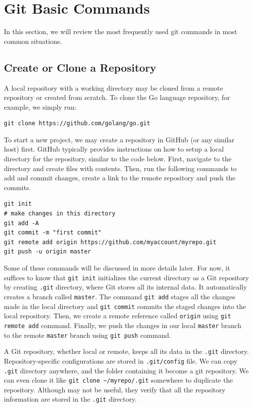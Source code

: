 \documentclass[11pt]{article}
\begin{document}
\section{\label{orgtarget4} Git Basic Commands}
\label{sec:orgheadline20}
In this section, we will review the most frequently used git commands in most common situations.
\subsection{Create or Clone a Repository}
\label{sec:orgheadline8}
A local repository with a working directory may be cloned from a remote repository or created from scratch. To clone the Go language repository, for example, we simply run:
\begin{verbatim}
git clone https://github.com/golang/go.git
\end{verbatim}
To start a new project, we may create a repository in GitHub (or any similar host) first. GitHub typically provides instructions on how to setup a local directory for the repository, similar to the code below. First, navigate to the directory and create files with contents. Then, run the following commands to add and commit changes, create a link to the remote repository and push the commits.
\begin{verbatim}
git init
# make changes in this directory
git add -A
git commit -m "first commit"
git remote add origin https://github.com/myaccount/myrepo.git
git push -u origin master
\end{verbatim}
Some of these commands will be discussed in more details later. For now, it suffices to know that \texttt{git init} initializes the current directory as a Git repository by creating \texttt{.git} directory, where Git stores all its internal data. It automatically creates a branch called \texttt{master}. The command \texttt{git add} stages all the changes made in the local directory and \texttt{git commit} commits the staged changes into the local repository. Then, we create a remote reference called \texttt{origin} using \texttt{git remote add} command. Finally, we push the changes in our local \texttt{master} branch to the remote \texttt{master} branch using \texttt{git push} command.

A Git repository, whether local or remote, keeps all its data in the \texttt{.git} directory. Repository-specific configurations are stored in \texttt{.git/config} file. We can copy \texttt{.git} directory anywhere, and the folder containing it become a git repository. We can even clone it like \texttt{git clone \textasciitilde{}/myrepo/.git} somewhere to duplicate the repository. Although may not be useful, they verify that all the repository information are stored in the \texttt{.git} directory.
\end{document}
